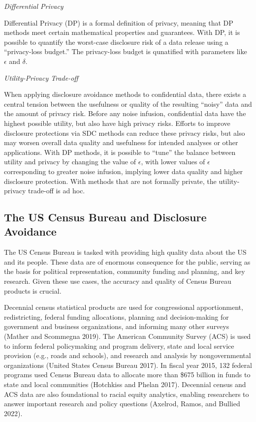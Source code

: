 \documentclass[
]{urban-formatting}
\begin{document}
\emph{Differential Privacy}

Differential Privacy (DP) is a formal definition of privacy, meaning
that DP methods meet certain mathematical properties and guarantees.
With DP, it is possible to quantify the worst-case disclosure risk of a
data release using a ``privacy-loss budget.'' The privacy-loss budget is
qunatified with parameters like \(\epsilon\) and \(\delta\).

\emph{Utility-Privacy Trade-off}

When applying disclosure avoidance methods to confidential data, there
exists a central tension between the usefulness or quality of the
resulting ``noisy'' data and the amount of privacy risk. Before any
noise infusion, confidential data have the highest possible utility, but
also have high privacy risks. Efforts to improve disclosure protections
via SDC methods can reduce these privacy risks, but also may worsen
overall data quality and usefulness for intended analyses or other
applications. With DP methods, it is possible to ``tune'' the balance
between utility and privacy by changing the value of \(\epsilon\), with
lower values of \(\epsilon\) corresponding to greater noise infusion,
implying lower data quality and higher disclosure protection. With
methods that are not formally private, the utility-privacy trade-off is
ad hoc.

\subsection{The US Census Bureau and Disclosure Avoidance}

The US Census Bureau is tasked with providing high quality data about
the US and its people. These data are of enormous consequence for the
public, serving as the basis for political representation, community
funding and planning, and key research. Given these use cases, the
accuracy and quality of Census Bureau products is crucial.

Decennial census statistical products are used for congressional
apportionment, redistricting, federal funding allocations, planning and
decision-making for government and business organizations, and informing
many other surveys (Mather and Scommegna 2019). The American Community
Survey (ACS) is used to inform federal policymaking and program
delivery, state and local service provision (e.g., roads and schools),
and research and analysis by nongovernmental organizations (United
States Census Bureau 2017). In fiscal year 2015, 132 federal programs
used Census Bureau data to allocate more than \$675 billion in funds to
state and local communities (Hotchkiss and Phelan 2017). Decennial
census and ACS data are also foundational to racial equity analytics,
enabling researchers to answer important research and policy questions
(Axelrod, Ramos, and Bullied 2022).
\end{document}
